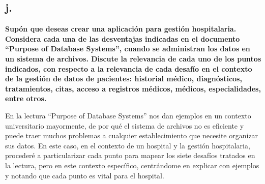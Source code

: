 
\subsection*{j.}

\textbf{Supón que deseas crear una aplicación para gestión hospitalaria. Considera cada una de las desventajas indicadas en el documento “Purpose of Database Systems”, cuando se administran los datos en un sistema de archivos. Discute la relevancia de cada uno de los puntos indicados, con respecto a la relevancia de cada desafío en el contexto de la gestión de datos de pacientes: historial médico, diagnósticos, tratamientos, citas, acceso a registros médicos, médicos, especialidades, entre otros.}

En la lectura ``Purpose of Database Systems'' \cite{PurposeDatabaseSystems} nos dan ejemplos en un contexto universitario mayormente, de por qué el sistema de archivos no es eficiente y puede traer muchos problemas a cualquier establecimiento que necesite organizar sus datos. En este caso, en el contexto de un hospital y la gestión hospitalaria, procederé a particularizar cada punto para mapear los siete desafíos tratados en la lectura, pero en este contexto específico, centrándome en explicar con ejemplos y notando que cada punto es vital para el hospital.

